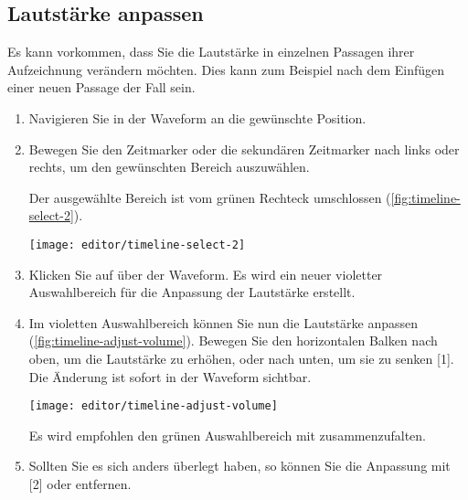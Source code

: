 \subsection{Lautstärke anpassen}
Es kann vorkommen, dass Sie die Lautstärke in einzelnen Passagen ihrer Aufzeichnung verändern möchten. Dies kann zum Beispiel nach dem Einfügen einer neuen Passage der Fall sein.

\begin{enumerate}
	\item Navigieren Sie in der Waveform an die gewünschte Position.
	\item Bewegen Sie den Zeitmarker \editorslider{} oder die sekundären Zeitmarker \editorsecondarysliderleft{}\editorsecondarysliderright{} nach links oder rechts, um den gewünschten Bereich auszuwählen.

	Der ausgewählte Bereich ist vom grünen Rechteck umschlossen (\autoref{fig:timeline-select-2}).

	\begin{minipage}{0.9\textwidth}
		\centering
		\captionsetup{type=figure}
		\texttt{[image: editor/timeline-select-2]}
		\label{fig:timeline-select-2}
	\end{minipage}

	\item Klicken Sie auf  \editoradjustvolume{} über der Waveform. Es wird ein neuer violetter Auswahlbereich für die Anpassung der Lautstärke erstellt.
	
	\item Im violetten Auswahlbereich können Sie nun die Lautstärke anpassen (\autoref{fig:timeline-adjust-volume}). Bewegen Sie den horizontalen Balken nach oben, um die Lautstärke zu erhöhen, oder nach unten, um sie zu senken [1]. Die Änderung ist sofort in der Waveform sichtbar.

	\begin{minipage}{0.9\textwidth}
		\centering
		\captionsetup{type=figure}
		\texttt{[image: editor/timeline-adjust-volume]}
		\label{fig:timeline-adjust-volume}
	\end{minipage}

	\begin{note}
		Es wird empfohlen den grünen Auswahlbereich mit \editorcollapseselection{} zusammenzufalten.
	\end{note}

	\item Sollten Sie es sich anders überlegt haben, so können Sie die Anpassung mit  [2] oder \editorundo{} entfernen.
\end{enumerate}


